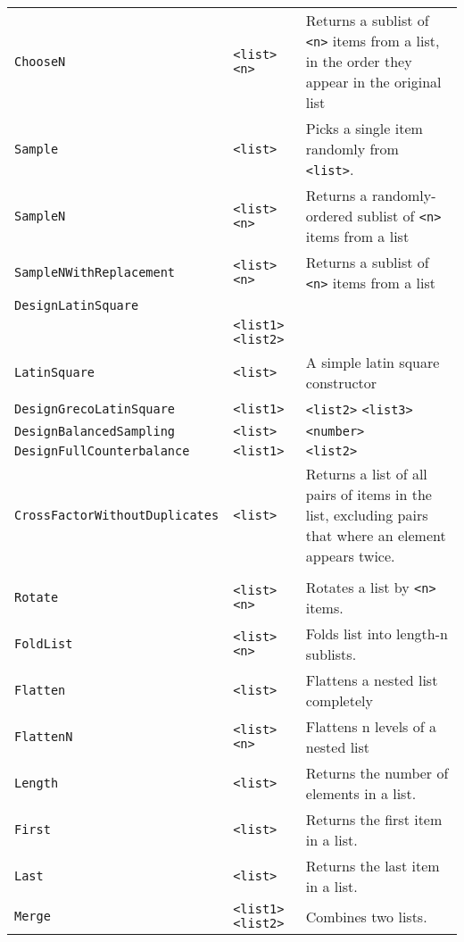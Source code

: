\begin{longtable}{p{3cm}p{3cm}p{6cm}}
\verb+ChooseN+ & \verb+<list>+ \verb+<n>+ & Returns a sublist of \verb+<n>+ items from a 
list, in the order they appear in the original list\\ 
\verb+Sample+ & \verb+<list>+ & Picks a single item randomly from \verb+<list>+.\\
\verb+SampleN+ & \verb+<list>+ \verb+<n>+ & Returns a randomly-ordered sublist of \verb+<n>+ items from a list\\ 
\verb+SampleNWithReplacement+ &\hspace{1.5cm} \verb+<list>+ \verb+<n>+& Returns a sublist of \verb+<n>+ items from a list \\ 
\verb+DesignLatinSquare+\\
  &\verb+<list1>+ \verb+<list2>+ & \\ 
\verb+LatinSquare+ &\verb+<list>+& A simple latin square constructor\\ 
\verb+DesignGrecoLatinSquare+ &\hspace{1.5cm}\verb+<list1>+ &\verb+<list2>+ \verb+<list3>+ \\ 
\verb+DesignBalancedSampling+ &\hspace{1.5cm}\verb+<list>+ & \verb+<number>+ \\ 
\verb+DesignFullCounterbalance+ &\hspace{1.5cm}\verb+<list1>+ &\verb+<list2>+ \\ 
\verb+CrossFactorWithoutDuplicates+ &\hspace{1.8cm}\verb+<list>+ & Returns a list of all pairs of items in the list, excluding pairs that where an element appears twice. \\ 
& & \\ 
\verb+Rotate+ &\verb+<list>+ \verb+<n>+ & Rotates a list by \verb+<n>+ items.\\ 
\verb+FoldList+ &\verb+<list>+ \verb+<n>+ & Folds list into length-n sublists.\\ 
\verb+Flatten+ &\verb+<list>+ & Flattens a nested list completely\\ 
\verb+FlattenN+ &\verb+<list>+ \verb+<n>+ & Flattens n levels of a nested list\\ 
\verb+Length+ &\verb+<list>+ & Returns the number of elements in a list.\\ 
\verb+First+ &\verb+<list>+ & Returns the first item in a list. \\ 
\verb+Last+ &\verb+<list>+ & Returns the last item in a list.\\ 
\verb+Merge+ &\verb+<list1>+ \verb+<list2>+& Combines two lists.\\ 

\end{longtable}
